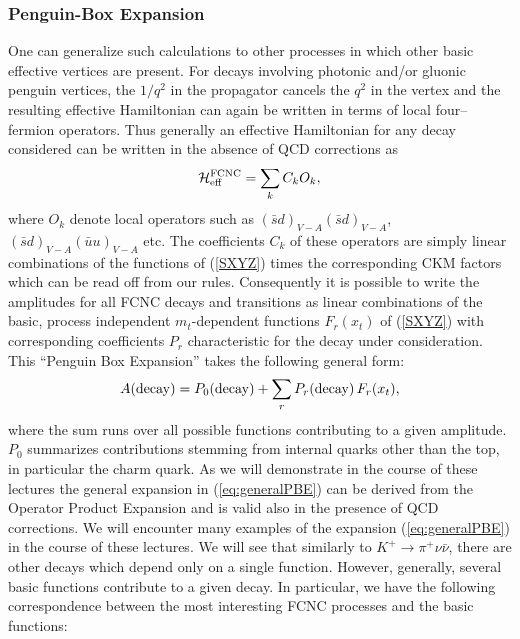 \documentclass[12pt]{article}
\begin{document}
\begin{itemize}
\subsubsection{Penguin-Box Expansion}
One can generalize such calculations to other processes in which
other basic effective vertices are present. 
For decays involving photonic and/or gluonic penguin vertices, the
$1/q^2$ in the propagator cancels the $q^2$ in the vertex and the
resulting effective Hamiltonian can again be written in terms of local
four--fermion operators. Thus generally an effective Hamiltonian for
any decay considered can be written in the absence of QCD corrections
as
\begin{equation}\label{exp}
{\cal H}_{\rm eff}^{\rm FCNC}=\sum_k C_k O_k,
\end{equation}
where $O_k$ denote local operators such as $(\bar s d)_{V-A}(\bar s
d)_{V-A}$, $(\bar s d)_{V-A}(\bar uu)_{V-A}$ etc. The coefficients
$C_k$ of these operators are simply linear combinations of the
functions of (\ref{SXYZ}) times the corresponding 
CKM factors which can
be read off from our rules. Consequently it is possible to write
the amplitudes for all FCNC decays and transitions 
as linear combinations of the basic,   process independent
$m_t$-dependent functions $F_r(x_t)$ of (\ref{SXYZ}) with
corresponding coefficients $P_r$ characteristic for the decay under
consideration. 
This ``Penguin Box Expansion'' \cite{PBE0} takes
the following general form:
\begin{equation}
A({\rm decay}) = P_0({\rm decay}) + \sum_r P_r({\rm decay}) \, F_r(x_t),
\label{eq:generalPBE}
\end{equation}
where the sum runs over all possible functions contributing to a given
amplitude. 
$P_0$  summarizes contributions stemming from internal quarks
other than the top, in particular the charm quark. As we will
demonstrate in the course of these lectures the general expansion
in (\ref{eq:generalPBE}) can be derived from the Operator Product
Expansion and is valid also in the presence of QCD corrections.
We will encounter many
examples of the expansion (\ref{eq:generalPBE}) in the course of 
these lectures.
We will see that similarly to $K^+\to\pi^+\nu\bar\nu$, there are other
decays which depend only on a single function. However, generally,
several basic functions contribute to a given decay. In particular,
we have the following correspondence between the most interesting FCNC
processes and the basic functions:


\end{itemize}
\end{document}
